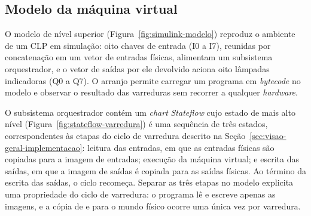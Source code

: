 \subsection{Modelo da máquina virtual}
\label{sub:modelo-vm}

O modelo de nível superior (Figura~\ref{fig:simulink-modelo}) reproduz o ambiente de um CLP em simulação: oito chaves de entrada (I0 a I7), reunidas por concatenação em um vetor de entradas físicas, alimentam um subsistema orquestrador, e o vetor de saídas por ele devolvido aciona oito lâmpadas indicadoras (Q0 a Q7).
O arranjo permite carregar um programa em \textit{bytecode} no modelo e observar o resultado das varreduras sem recorrer a qualquer \textit{hardware}.

\begin{figurafixa}
    \centering
    \label{fig:simulink-modelo}

\end{figurafixa}

O subsistema orquestrador contém um \textit{chart} \textit{Stateflow} cujo estado de mais alto nível (Figura~\ref{fig:stateflow-varredura}) é uma sequência de três estados, correspondentes às etapas do ciclo de varredura descrito na Seção~\ref{sec:visao-geral-implementacao}: leitura das entradas, em que as entradas físicas são copiadas para a imagem de entradas; execução da máquina virtual; e escrita das saídas, em que a imagem de saídas é copiada para as saídas físicas.
Ao término da escrita das saídas, o ciclo recomeça.
Separar as três etapas no modelo explicita uma propriedade do ciclo de varredura: o programa lê e escreve apenas as imagens, e a cópia de e para o mundo físico ocorre uma única vez por varredura.

\begin{figurafixa}
    \centering
    \label{fig:stateflow-varredura}

\end{figurafixa}

